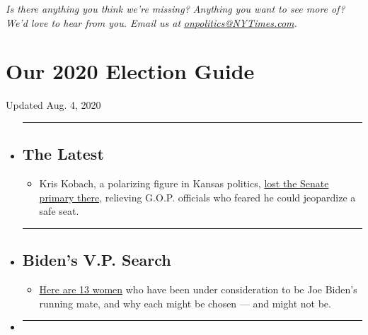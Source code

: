 \emph{Is there anything you think we're missing? Anything you want to
see more of? We'd love to hear from you. Email us at}
\href{mailto:onpolitics@NYTimes.com}{\emph{onpolitics@NYTimes.com}}\emph{.}

\hypertarget{our-2020-election-guide}{%
\section{Our 2020 Election Guide}\label{our-2020-election-guide}}

Updated Aug. 4, 2020

\begin{itemize}
\item
  \begin{center}\rule{0.5\linewidth}{\linethickness}\end{center}

  \hypertarget{the-latest}{%
  \subsection{The Latest}\label{the-latest}}

  \begin{itemize}
  \tightlist
  \item
    Kris Kobach, a polarizing figure in Kansas politics,
    \href{https://www.nytimes3xbfgragh.onion/2020/08/04/us/politics/kobach-tlaib.html?action=click\&pgtype=Article\&state=default\&region=BELOW_MAIN_CONTENT\&context=storylines_guide}{lost
    the Senate primary there}, relieving G.O.P. officials who feared he
    could jeopardize a safe seat.
  \end{itemize}
\item
  \begin{center}\rule{0.5\linewidth}{\linethickness}\end{center}

  \hypertarget{bidens-vp-search}{%
  \subsection{Biden's V.P. Search}\label{bidens-vp-search}}

  \begin{itemize}
  \tightlist
  \item
    \href{https://www.nytimes3xbfgragh.onion/article/biden-vice-president-2020.html?action=click\&pgtype=Article\&state=default\&region=BELOW_MAIN_CONTENT\&context=storylines_guide}{Here
    are 13 women} who have been under consideration to be Joe Biden's
    running mate, and why each might be chosen --- and might not be.
  \end{itemize}
\item
  \begin{center}\rule{0.5\linewidth}{\linethickness}\end{center}


\end{itemize}
